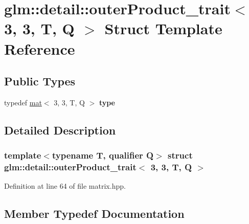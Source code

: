 \hypertarget{structglm_1_1detail_1_1outerProduct__trait_3_013_00_013_00_01T_00_01Q_01_4}{}\section{glm\+:\+:detail\+:\+:outer\+Product\+\_\+trait$<$ 3, 3, T, Q $>$ Struct Template Reference}
\label{structglm_1_1detail_1_1outerProduct__trait_3_013_00_013_00_01T_00_01Q_01_4}
\subsection*{Public Types}
\begin{DoxyCompactItemize}
\item 
\mbox{\label{structglm_1_1detail_1_1outerProduct__trait_3_013_00_013_00_01T_00_01Q_01_4_a40c77da697de58aa2f84dab85c4d9ee8}} 
typedef \hyperlink{structglm_1_1mat}{mat}$<$ 3, 3, T, Q $>$ {\bfseries type}
\end{DoxyCompactItemize}


\subsection{Detailed Description}
\subsubsection*{template$<$typename T, qualifier Q$>$\newline
struct glm\+::detail\+::outer\+Product\+\_\+trait$<$ 3, 3, T, Q $>$}



Definition at line 64 of file matrix.\+hpp.



\subsection{Member Typedef Documentation}
\mbox{\label{structglm_1_1detail_1_1outerProduct__trait_3_013_00_013_00_01T_00_01Q_01_4_a40c77da697de58aa2f84dab85c4d9ee8}} 
